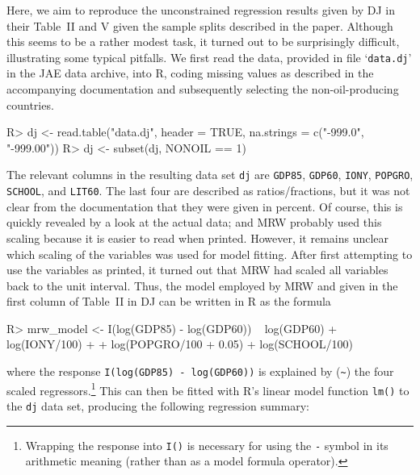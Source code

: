 \documentclass[10pt,a4paper,twoside]{article}
\let\code=\texttt
\let\proglang=\textsf
\newcommand{\file}[1]{`\code{#1}'}
\newenvironment{Schunk}{}{}
\begin{document}
Here, we aim to reproduce the unconstrained regression results given by DJ in their Table~II and V
given the sample splits described in the paper. Although this seems to be a rather modest task, it turned
out to be surprisingly difficult, illustrating some typical pitfalls. We first read the data,
provided in file \file{data.dj} in the JAE data archive, into \proglang{R}, coding missing values
as described in the accompanying documentation and subsequently selecting the non-oil-producing
countries.

\begin{Schunk}
\begin{Sinput}
R> dj <- read.table("data.dj", header = TRUE, na.strings = c("-999.0", "-999.00"))
R> dj <- subset(dj, NONOIL == 1)
\end{Sinput}
\end{Schunk}

The relevant columns in the resulting data set \code{dj} are \code{GDP85},
\code{GDP60}, \code{IONY}, \code{POPGRO}, \code{SCHOOL}, and \code{LIT60}.
The last four are described as ratios/fractions, but it was not clear from the
documentation that they were given in percent. Of course, this is quickly revealed by
a look at the actual data; and MRW probably used this scaling because it is easier to
read when printed. However, it remains unclear which scaling of the variables
was used for model fitting. After first attempting to use the variables as printed, it
turned out that MRW had scaled all variables back to the unit interval. Thus,
the model employed by MRW and given in the first column of Table~II in DJ
can be written in \proglang{R} as the formula

\begin{Schunk}
\begin{Sinput}
R> mrw_model <- I(log(GDP85) - log(GDP60)) ~ log(GDP60) + log(IONY/100) +
+    log(POPGRO/100 + 0.05) + log(SCHOOL/100)
\end{Sinput}
\end{Schunk}

where the response \code{I(log(GDP85) - log(GDP60))} is explained by (\code{\~})
the four scaled regressors.\footnote{Wrapping the response into \code{I()}
is necessary for using the \code{-} symbol in its arithmetic meaning (rather than as
a model formula operator).} This can then be fitted with \proglang{R}'s linear model
function \code{lm()} to the \code{dj} data set, producing the following regression
summary:
\end{document}

